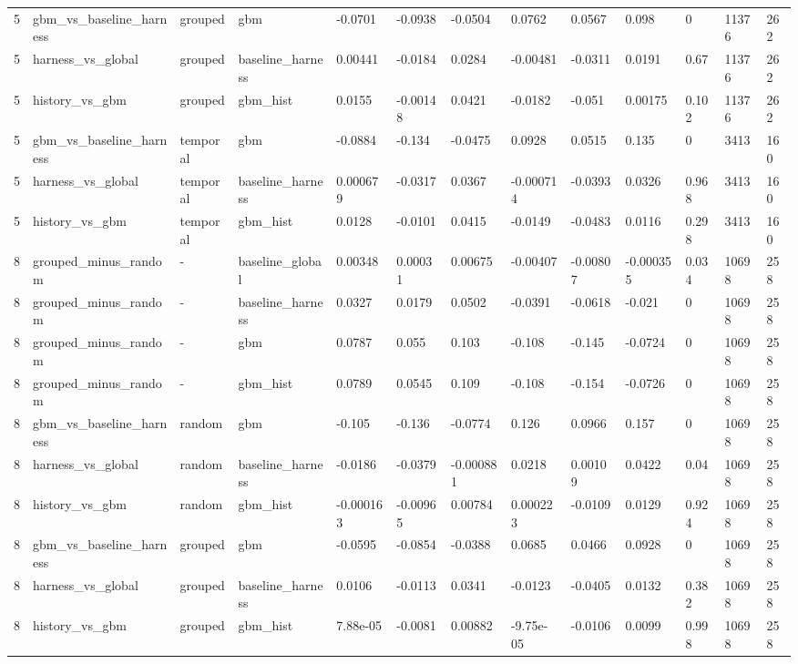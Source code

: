 \begin{tabular}{lllllllllllll}
5 & gbm\_vs\_baseline\_harness & grouped & gbm & -0.0701 & -0.0938 & -0.0504 & 0.0762 & 0.0567 & 0.098 & 0 & 11376 & 262 \\
5 & harness\_vs\_global & grouped & baseline\_harness & 0.00441 & -0.0184 & 0.0284 & -0.00481 & -0.0311 & 0.0191 & 0.67 & 11376 & 262 \\
5 & history\_vs\_gbm & grouped & gbm\_hist & 0.0155 & -0.00148 & 0.0421 & -0.0182 & -0.051 & 0.00175 & 0.102 & 11376 & 262 \\
5 & gbm\_vs\_baseline\_harness & temporal & gbm & -0.0884 & -0.134 & -0.0475 & 0.0928 & 0.0515 & 0.135 & 0 & 3413 & 160 \\
5 & harness\_vs\_global & temporal & baseline\_harness & 0.000679 & -0.0317 & 0.0367 & -0.000714 & -0.0393 & 0.0326 & 0.968 & 3413 & 160 \\
5 & history\_vs\_gbm & temporal & gbm\_hist & 0.0128 & -0.0101 & 0.0415 & -0.0149 & -0.0483 & 0.0116 & 0.298 & 3413 & 160 \\
8 & grouped\_minus\_random & - & baseline\_global & 0.00348 & 0.00031 & 0.00675 & -0.00407 & -0.00807 & -0.000355 & 0.034 & 10698 & 258 \\
8 & grouped\_minus\_random & - & baseline\_harness & 0.0327 & 0.0179 & 0.0502 & -0.0391 & -0.0618 & -0.021 & 0 & 10698 & 258 \\
8 & grouped\_minus\_random & - & gbm & 0.0787 & 0.055 & 0.103 & -0.108 & -0.145 & -0.0724 & 0 & 10698 & 258 \\
8 & grouped\_minus\_random & - & gbm\_hist & 0.0789 & 0.0545 & 0.109 & -0.108 & -0.154 & -0.0726 & 0 & 10698 & 258 \\
8 & gbm\_vs\_baseline\_harness & random & gbm & -0.105 & -0.136 & -0.0774 & 0.126 & 0.0966 & 0.157 & 0 & 10698 & 258 \\
8 & harness\_vs\_global & random & baseline\_harness & -0.0186 & -0.0379 & -0.000881 & 0.0218 & 0.00109 & 0.0422 & 0.04 & 10698 & 258 \\
8 & history\_vs\_gbm & random & gbm\_hist & -0.000163 & -0.00965 & 0.00784 & 0.000223 & -0.0109 & 0.0129 & 0.924 & 10698 & 258 \\
8 & gbm\_vs\_baseline\_harness & grouped & gbm & -0.0595 & -0.0854 & -0.0388 & 0.0685 & 0.0466 & 0.0928 & 0 & 10698 & 258 \\
8 & harness\_vs\_global & grouped & baseline\_harness & 0.0106 & -0.0113 & 0.0341 & -0.0123 & -0.0405 & 0.0132 & 0.382 & 10698 & 258 \\
8 & history\_vs\_gbm & grouped & gbm\_hist & 7.88e-05 & -0.0081 & 0.00882 & -9.75e-05 & -0.0106 & 0.0099 & 0.998 & 10698 & 258 \\

\end{tabular}
